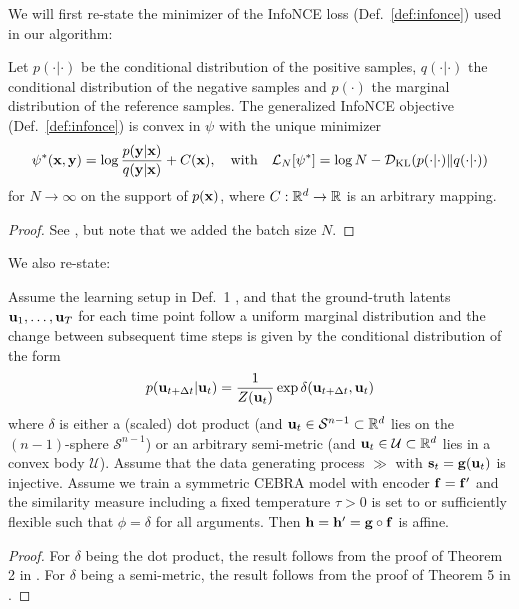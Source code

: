     We will first re-state the minimizer of the InfoNCE loss (Def.~\ref{def:infonce}) used in our algorithm:
   \begin{proposition}\label{prop:infonce-minimizer}
    Let $p(\cdot | \cdot)$ be the conditional distribution of the positive samples, $q(\cdot | \cdot)$ the conditional distribution of the negative samples and $p(\cdot)$ the marginal distribution of the reference samples. 
    The generalized InfoNCE objective (Def.~\ref{def:infonce}) is convex in $\psi$ with the unique minimizer
    \begin{equation}
        \psi^*(\mathbf{x},\mathbf{y}) = \log{\frac{p(\mathbf{y}| \mathbf{x})}{q(\mathbf{y}| \mathbf{x})}} + C(\mathbf{x}), \quad \text{with} \quad
        \mathcal{L}_N[\psi^*] = \log N - \mathcal{D}_{\mathrm{KL}}(p(\cdot|\cdot) \| q(\cdot|\cdot))
    \end{equation}
    for $N \rightarrow \infty$ on the support of $p(\mathbf{x})$, where $C: \mathbb{R}^{d} \to \mathbb{R}$ is an arbitrary mapping. 
    \begin{proof}
            See \cite{schneider2023cebra}, but note that we added the batch size $N$.
        \end{proof}
    \end{proposition}

    We also re-state:
    \begin{proposition}\label{prop:discovery-driven-identifiability}
        Assume the learning setup in Def.~1 \citep{schneider2023cebra}, and that the ground-truth latents $\mathbf{u}_1,\dots,\mathbf{u}_T$ for each time point follow a uniform marginal distribution and the change between subsequent time steps is given by the conditional distribution of the form
        \begin{equation}
            p(\mathbf{u}_{t + \Delta t} | \mathbf{u}_{t}) = \frac{1}{Z(\mathbf{u}_{t})}  \exp \delta (\mathbf{u}_{t + \Delta t}, \mathbf{u}_{t})
        \end{equation}
        where $\delta$ is either a (scaled) dot product (and $\mathbf{u}_t \in \mathcal{S}^{n-1} \subset \mathbb{R}^d$ lies on the $(n-1)$-sphere $\mathcal{S}^{n-1}$) or an arbitrary semi-metric (and $\mathbf{u}_t \in \mathcal{U} \subset \mathbb{R}^{d}$ lies in a convex body $\mathcal{U}$).
        Assume that the data generating process $\gg$ with $\mathbf{s}_t = \mathbf{g}(\mathbf{u}_t)$ is injective.
        Assume we train a symmetric CEBRA \citep{schneider2023cebra} model with encoder $\mathbf{f}=\mathbf{f}'$ and the similarity measure including a fixed temperature $\tau > 0$ is set to or sufficiently flexible such that $\phi = \delta$ for all arguments.
        Then $\mathbf{h} = \mathbf{h}' = \mathbf{g} \circ \mathbf{f}$ is affine.
        \begin{proof}
            For $\delta$ being the dot product, the result follows from the proof of Theorem 2 in \citet{zimmermann2021contrastive}.
            For $\delta$ being a semi-metric, the result follows from the proof of Theorem 5 in \citet{zimmermann2021contrastive}. 
        \end{proof}
    \end{proposition} 

